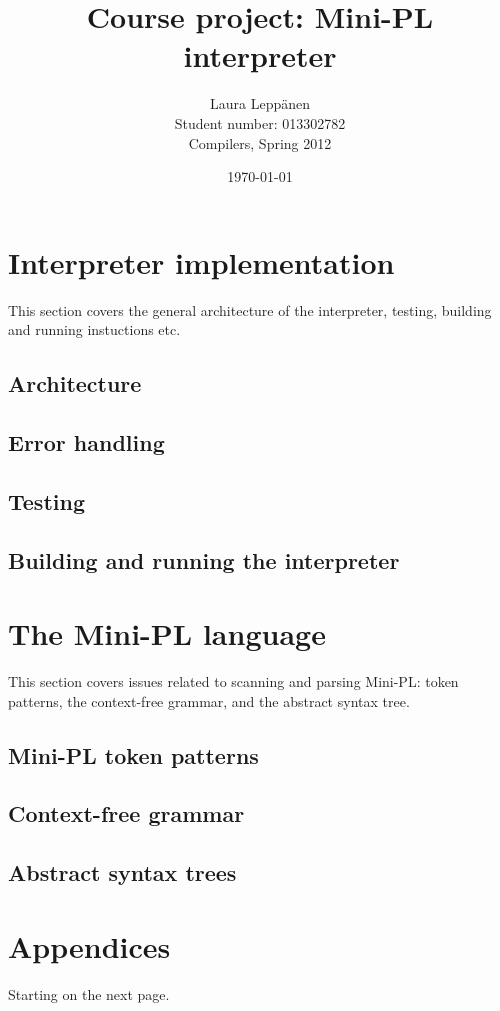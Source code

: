 \documentclass[a4paper,11pt]{article}
\begin{document}
\title{Course project: Mini-PL interpreter}
\author{Laura Leppänen \\ Student number: 013302782 \\ Compilers, Spring 2012}
\date{\today}
\maketitle
\thispagestyle{empty}

\tableofcontents
\onehalfspacing

\newpage
\setcounter{page}{1}

\section{Interpreter implementation}

This section covers the general architecture of the interpreter, testing, building and running instuctions etc.

\subsection{Architecture}

\subsection{Error handling}

\subsection{Testing}

\subsection{Building and running the interpreter}

\section{The Mini-PL language}

This section covers issues related to scanning and parsing Mini-PL: token patterns, the context-free grammar, and the abstract syntax tree.

\subsection{Mini-PL token patterns}

\subsection{Context-free grammar}

\subsection{Abstract syntax trees}

\appendix
\section{Appendices}

Starting on the next page.




\end{document}
